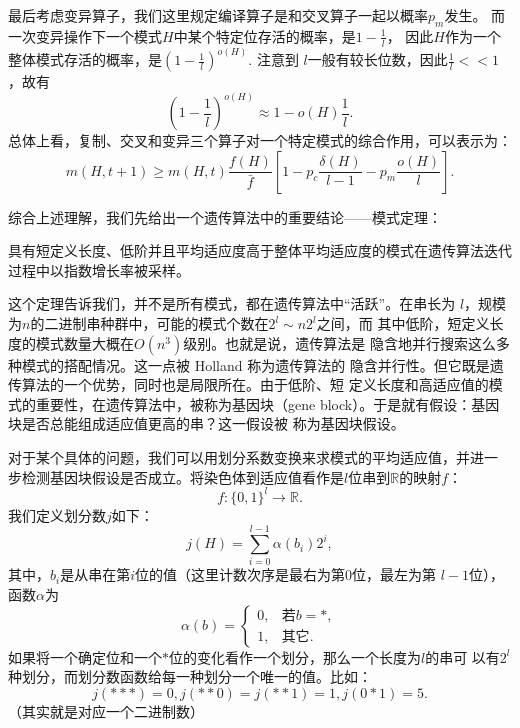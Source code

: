 最后考虑变异算子，我们这里规定编译算子是和交叉算子一起以概率$p_m$发生。
而一次变异操作下一个模式$H$中某个特定位存活的概率，是$1 - \frac{1}{l}$，
因此$H$作为一个整体模式存活的概率，是$(1 - \frac{1}{l})^{o(H)}$. 注意到
$l$一般有较长位数，因此$\frac{1}{l} << 1$，故有
$$
(1 - \frac{1}{l})^{o(H)} \approx 1 - o(H)\frac{1}{l}.
$$
总体上看，复制、交叉和变异三个算子对一个特定模式的综合作用，可以表示为：
\begin{equation}
  m(H, t + 1) \geq m(H, t)\frac{f(H)}{\bar{f}}
  \left[1 - p_c\frac{\delta(H)}{l - 1} - p_m\frac{o(H)}{l}\right].
  \label{eq::GA_model}
\end{equation}

综合上述理解，我们先给出一个遗传算法中的重要结论——模式定理：

\begin{theorem}
  具有短定义长度、低阶并且平均适应度高于整体平均适应度的模式在遗传算法迭代
  过程中以指数增长率被采样。
\end{theorem}

这个定理告诉我们，并不是所有模式，都在遗传算法中“活跃”。在串长为
$l$，规模为$n$的二进制串种群中，可能的模式个数在$2^l \sim n2^l$之间，而
其中低阶，短定义长度的模式数量大概在$O(n^3)$级别。也就是说，遗传算法是
隐含地并行搜索这么多种模式的搭配情况。这一点被 Holland 称为遗传算法的
隐含并行性。但它既是遗传算法的一个优势，同时也是局限所在。由于低阶、短
定义长度和高适应值的模式的重要性，在遗传算法中，被称为基因块（gene
  block）。于是就有假设：基因块是否总能组成适应值更高的串？这一假设被
称为基因块假设。

对于某个具体的问题，我们可以用划分系数变换来求模式的平均适应值，并进一
步检测基因块假设是否成立。将染色体到适应值看作是$l$位串到$\mathbb{R}$的映射$f$：
$$
f : \{0, 1\}^l \to \mathbb{R}.
$$
我们定义划分数$j$如下：
\begin{equation}
  j(H) = \sum_{i = 0}^{l - 1}\alpha(b_i)2^i,
  \label{eq::GA_split}
\end{equation}
其中，$b_i$是从串在第$i$位的值（这里计数次序是最右为第$0$位，最左为第
  $l - 1$位），函数$\alpha$为
\begin{equation}
  \alpha(b) = \left\{
  \begin{array}{ll}
    0, &\mbox{若}b = *,\\
    1, &\mbox{其它}.
  \end{array}
  \right.
  \label{eq::GA_bit_mark}
\end{equation}
如果将一个确定位和一个$*$位的变化看作一个划分，那么一个长度为$l$的串可
以有$2^l$种划分，而划分数函数给每一种划分一个唯一的值。比如：
$$
j(***) = 0, j(**0) = j(**1) = 1, j(0*1) = 5.
$$
（其实就是对应一个二进制数）

